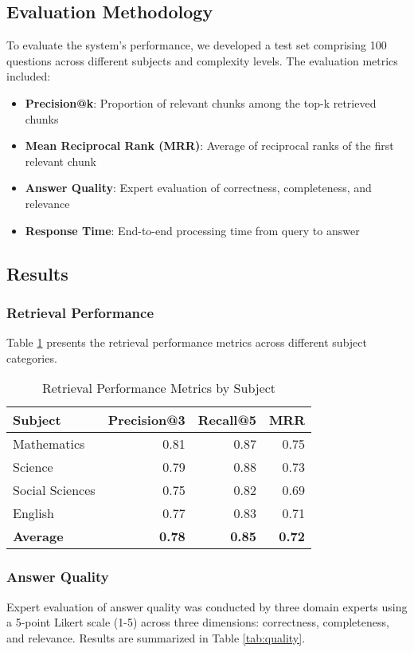 \documentclass[10pt,conference]{IEEEtran}
\begin{document}
\subsection{Evaluation Methodology}
To evaluate the system's performance, we developed a test set comprising 100 questions across different subjects and complexity levels. The evaluation metrics included:

\begin{itemize}
    \item \textbf{Precision@k}: Proportion of relevant chunks among the top-k retrieved chunks
    \item \textbf{Mean Reciprocal Rank (MRR)}: Average of reciprocal ranks of the first relevant chunk
    \item \textbf{Answer Quality}: Expert evaluation of correctness, completeness, and relevance
    \item \textbf{Response Time}: End-to-end processing time from query to answer
\end{itemize}

\subsection{Results}
\subsubsection{Retrieval Performance}
Table \ref{tab:retrieval} presents the retrieval performance metrics across different subject categories.

\begin{table}[h]
\centering
\caption{Retrieval Performance Metrics by Subject}
\label{tab:retrieval}
\begin{tabular}{lrrr}
\toprule
\textbf{Subject} & \textbf{Precision@3} & \textbf{Recall@5} & \textbf{MRR} \\
\midrule
Mathematics & 0.81 & 0.87 & 0.75 \\
Science & 0.79 & 0.88 & 0.73 \\
Social Sciences & 0.75 & 0.82 & 0.69 \\
English & 0.77 & 0.83 & 0.71 \\
\midrule
\textbf{Average} & \textbf{0.78} & \textbf{0.85} & \textbf{0.72} \\
\bottomrule
\end{tabular}
\end{table}

\subsubsection{Answer Quality}
Expert evaluation of answer quality was conducted by three domain experts using a 5-point Likert scale (1-5) across three dimensions: correctness, completeness, and relevance. Results are summarized in Table \ref{tab:quality}.
\end{document}
